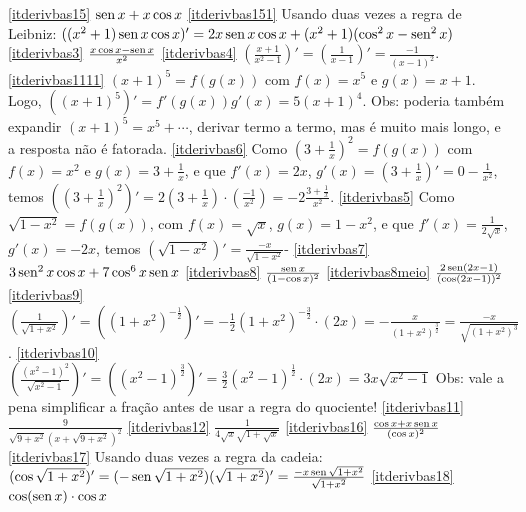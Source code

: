 \begin{exo}
\begin{sol}
\eqref{itderivbas15} $\operatorname{sen} x+x\cos x$
\eqref{itderivbas151} Usando duas vezes a regra de Leibniz: 
$((x^2+1)\operatorname{sen} x\cos x)'=2x\operatorname{sen} x\cos x+(x^2+1)(\cos^2x-\operatorname{sen}^2x)$
\eqref{itderivbas3} $\frac{x\cos x-\operatorname{sen} x}{x^2}$
\eqref{itderivbas4} $(\frac{x+1}{x^2-1})'=(\frac{1}{x-1})'=\frac{-1}{(x-1)^2}$.
\eqref{itderivbas1111} $(x+1)^5=f(g(x))$ com $f(x)=x^5$ e $g(x)=x+1$.
Logo, $((x+1)^5)'=f'(g(x))g'(x)=5(x+1)^4$. Obs: poderia também expandir
$(x+1)^5=x^5+\cdots$, derivar termo a termo, mas é muito mais longo, e a
resposta não é fatorada.
\eqref{itderivbas6} Como $(3+\frac{1}{x})^2=f(g(x))$ com
$f(x)=x^2$ e $g(x)=3+\frac{1}{x}$, e que $f'(x)=2x$,
$g'(x)=(3+\frac{1}{x})'=0-\frac{1}{x^2}$, temos
$((3+\frac{1}{x})^2)'=2(3+\frac{1}{x})\cdot(\frac{-1}{x^2})=-2\frac{3+\frac{1}
{x}}{x^2}$.
\eqref{itderivbas5} Como $\sqrt{1-x^2}=f(g(x))$, com $f(x)=\sqrt{x}$,
$g(x)=1-x^2$, e que $f'(x)=\frac{1}{2\sqrt{x}}$, $g'(x)=-2x$,
temos $(\sqrt{1-x^2})'=\frac{-x}{\sqrt{1-x^2}}$-
\eqref{itderivbas7} $3\operatorname{sen}^2x\cos x+7\cos^6x\operatorname{sen} x$
\eqref{itderivbas8} $\frac{\operatorname{sen} x}{(1-\cos x)^2}$
\eqref{itderivbas8meio} $\frac{2\operatorname{sen} (2x-1)}{(\cos(2x-1))^2}$
\eqref{itderivbas9}
$(\frac{1}{\sqrt{1+x^2}})'=((1+x^2)^{-\frac12})'=-\frac12(1+x^2)^{-\frac32}
\cdot (2x)=-\frac{x}{(1+x^2)^{\frac32}}=\frac{-x}{\sqrt{(1+x^2)^3}}$. 
\eqref{itderivbas10}
$(\frac{(x^2-1)^2}{\sqrt{x^2-1}})'=((x^2-1)^{\frac32})'=\frac{3}{2}(x^2-1)^{
\frac12}
\cdot(2x)=3x\sqrt{x^2-1}$ Obs: vale a pena simplificar a fração antes de
usar a regra do quociente!
\eqref{itderivbas11} $\frac{9}{\sqrt{9+x^2}(x+\sqrt{9+x^2})^2}$
\eqref{itderivbas12} $\frac{1}{4\sqrt{x}\sqrt{1+\sqrt{x}}}$
\eqref{itderivbas16} $\frac{\cos x+x\operatorname{sen} x}{(\cos x)^2}$
\eqref{itderivbas17} Usando duas vezes a regra da cadeia:
$(\cos\sqrt{1+x^2})'=(-\operatorname{sen} \sqrt{1+x^2})(\sqrt{1+x^2})'=\frac{-x\operatorname{sen}
\sqrt{1+x^2}}{\sqrt{1+x^2}}$ 
\eqref{itderivbas18} $\cos(\operatorname{sen} x)\cdot\cos x$
\end{sol}
\end{exo}


